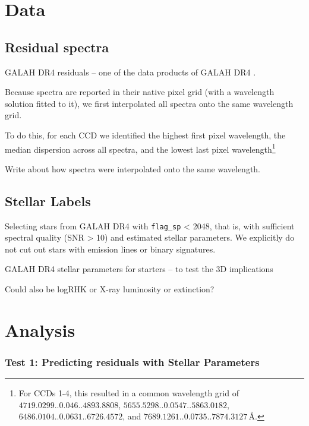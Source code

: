 \documentclass[twocolumn,apj,numberedappendix,appendixfloats]{openjournal}
\begin{document}
\section{Data} \label{sec:data}

\subsection{Residual spectra} \label{sec:data_residuals}

GALAH DR4 residuals -- one of the data products of GALAH DR4 \citep{Buder2024b}.

Because spectra are reported in their native pixel grid (with a wavelength solution fitted to it), we first interpolated all spectra onto the same wavelength grid.

To do this, for each CCD we identified the highest first pixel wavelength, the median dispersion across all spectra, and the lowest last pixel wavelength\footnote{For CCDs 1-4, this resulted in a common wavelength grid of $4719.0299..0.046..4893.8808$, $5655.5298..0.0547..5863.0182$, $6486.0104..0.0631..6726.4572$, and 
$7689.1261..0.0735..7874.3127$\,\AA.}



Write about how spectra were interpolated onto the same wavelength.

\subsection{Stellar Labels} \label{sec:data_labels}

Selecting stars from GALAH DR4 with \texttt{flag\_sp} < 2048, that is, with sufficient spectral quality (SNR > 10) and estimated stellar parameters. We explicitly do not cut out stars with emission lines or binary signatures.

GALAH DR4 stellar parameters for starters -- to test the 3D implications

Could also be logRHK or X-ray luminosity or extinction?

\section{Analysis} \label{sec:analysis}

\subsubsection{Test 1: Predicting residuals with Stellar Parameters}
\end{document}
